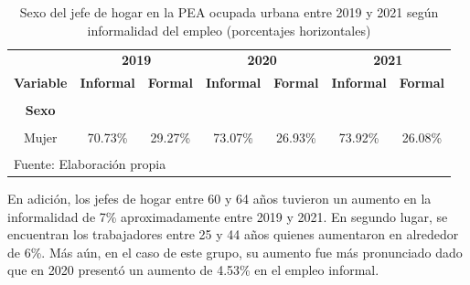 \documentclass[
  letterpaper,
  12pt,
  oneside,
  spanish,
  doublespacing,
  headsepline,
  parskip]{MastersDoctoralThesis}
\begin{document}
\hypertarget{tbl-sex}{}
\begin{table}[H]
\caption{\label{tbl-sex}Sexo del jefe de hogar en la PEA ocupada urbana entre 2019 y 2021 según
informalidad del empleo (porcentajes horizontales) }\tabularnewline

\centering\begingroup\fontsize{10}{12}\selectfont

\begin{tabular}{ccccccc}
\toprule
\multicolumn{1}{c}{ } & \multicolumn{2}{c}{\textbf{2019}} & \multicolumn{2}{c}{\textbf{2020}} & \multicolumn{2}{c}{\textbf{2021}} \\
\cmidrule(l{3pt}r{3pt}){2-3} \cmidrule(l{3pt}r{3pt}){4-5} \cmidrule(l{3pt}r{3pt}){6-7}
\textbf{Variable} & \textbf{Informal} & \textbf{Formal} & \textbf{Informal} & \textbf{Formal} & \textbf{Informal} & \textbf{Formal}\\
\midrule
\cellcolor{gray!6}{\textbf{Nacional}} & \cellcolor{gray!6}{62.98\%} & \cellcolor{gray!6}{37.02\%} & \cellcolor{gray!6}{66.17\%} & \cellcolor{gray!6}{33.83\%} & \cellcolor{gray!6}{68.45\%} & \cellcolor{gray!6}{31.55\%}\\
\textbf{Sexo} &  &  &  &  &  & \\
\cellcolor{gray!6}{Hombre} & \cellcolor{gray!6}{60.09\%} & \cellcolor{gray!6}{39.91\%} & \cellcolor{gray!6}{63.52\%} & \cellcolor{gray!6}{36.48\%} & \cellcolor{gray!6}{65.98\%} & \cellcolor{gray!6}{34.02\%}\\
Mujer & 70.73\% & 29.27\% & 73.07\% & 26.93\% & 73.92\% & 26.08\%\\
\bottomrule
\multicolumn{7}{l}{\textsuperscript{} Fuente: Elaboración propia}\\
\end{tabular}
\endgroup{}
\end{table}

En adición, los jefes de hogar entre 60 y 64 años tuvieron un aumento en
la informalidad de 7\% aproximadamente entre 2019 y 2021. En segundo
lugar, se encuentran los trabajadores entre 25 y 44 años quienes
aumentaron en alrededor de 6\%. Más aún, en el caso de este grupo, su
aumento fue más pronunciado dado que en 2020 presentó un aumento de
4.53\% en el empleo informal.
\end{document}
